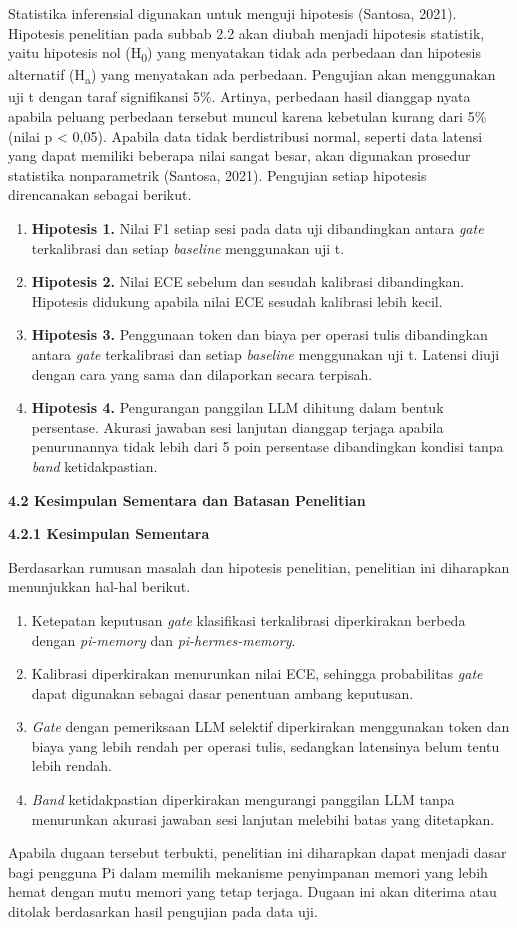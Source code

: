 \documentclass[12pt,a4paper]{article}
\newcommand{\asing}[1]{\textit{#1}}
\newcommand{\pim}{\textit{pi-memory}}
\newcommand{\phm}{\textit{pi-hermes-memory}}
\newcommand{\subbab}[2]{%
  \par\vspace{0.8em}\phantomsection\label{#2}%
  \noindent\textbf{#1}\par\nopagebreak\vspace{0.3em}}
\newcommand{\subsubbab}[2]{%
  \par\vspace{0.5em}\phantomsection\label{#2}%
  \noindent\textbf{#1}\par\nopagebreak\vspace{0.2em}}
\begin{document}
Statistika inferensial digunakan untuk menguji hipotesis (Santosa, 2021). Hipotesis penelitian pada subbab 2.2 akan diubah menjadi hipotesis statistik, yaitu hipotesis nol (H\textsubscript{0}) yang menyatakan tidak ada perbedaan dan hipotesis alternatif (H\textsubscript{a}) yang menyatakan ada perbedaan. Pengujian akan menggunakan uji t dengan taraf signifikansi 5\%. Artinya, perbedaan hasil dianggap nyata apabila peluang perbedaan tersebut muncul karena kebetulan kurang dari 5\% (nilai p \textless{} 0,05). Apabila data tidak berdistribusi normal, seperti data latensi yang dapat memiliki beberapa nilai sangat besar, akan digunakan prosedur statistika nonparametrik (Santosa, 2021). Pengujian setiap hipotesis direncanakan sebagai berikut.
\begin{enumerate}[leftmargin=1.25cm]
\item \textbf{Hipotesis 1.} Nilai F1 setiap sesi pada data uji dibandingkan antara \asing{gate} terkalibrasi dan setiap \asing{baseline} menggunakan uji t.
\item \textbf{Hipotesis 2.} Nilai ECE sebelum dan sesudah kalibrasi dibandingkan. Hipotesis didukung apabila nilai ECE sesudah kalibrasi lebih kecil.
\item \textbf{Hipotesis 3.} Penggunaan token dan biaya per operasi tulis dibandingkan antara \asing{gate} terkalibrasi dan setiap \asing{baseline} menggunakan uji t. Latensi diuji dengan cara yang sama dan dilaporkan secara terpisah.
\item \textbf{Hipotesis 4.} Pengurangan panggilan LLM dihitung dalam bentuk persentase. Akurasi jawaban sesi lanjutan dianggap terjaga apabila penurunannya tidak lebih dari 5 poin persentase dibandingkan kondisi tanpa \asing{band} ketidakpastian.
\end{enumerate}

\subbab{4.2 Kesimpulan Sementara dan Batasan Penelitian}{sec:4.2}

\subsubbab{4.2.1 Kesimpulan Sementara}{sec:4.2.1}

Berdasarkan rumusan masalah dan hipotesis penelitian, penelitian ini diharapkan menunjukkan hal-hal berikut.
\begin{enumerate}[leftmargin=1.25cm]
\item Ketepatan keputusan \asing{gate} klasifikasi terkalibrasi diperkirakan berbeda dengan \pim{} dan \phm{}.
\item Kalibrasi diperkirakan menurunkan nilai ECE, sehingga probabilitas \asing{gate} dapat digunakan sebagai dasar penentuan ambang keputusan.
\item \asing{Gate} dengan pemeriksaan LLM selektif diperkirakan menggunakan token dan biaya yang lebih rendah per operasi tulis, sedangkan latensinya belum tentu lebih rendah.
\item \asing{Band} ketidakpastian diperkirakan mengurangi panggilan LLM tanpa menurunkan akurasi jawaban sesi lanjutan melebihi batas yang ditetapkan.
\end{enumerate}
Apabila dugaan tersebut terbukti, penelitian ini diharapkan dapat menjadi dasar bagi pengguna Pi dalam memilih mekanisme penyimpanan memori yang lebih hemat dengan mutu memori yang tetap terjaga. Dugaan ini akan diterima atau ditolak berdasarkan hasil pengujian pada data uji.
\end{document}
